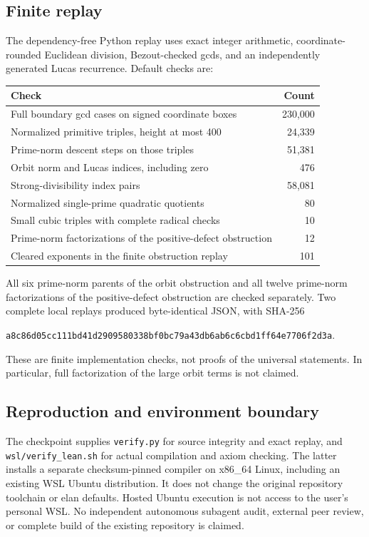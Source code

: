 \subsection{Finite replay}
The dependency-free Python replay uses exact integer arithmetic, coordinate-rounded Euclidean division, Bezout-checked gcds, and an independently generated Lucas recurrence. Default checks are:
\begin{center}
\begin{tabular}{@{}lr@{}}
\toprule
Check & Count\\\midrule
Full boundary gcd cases on signed coordinate boxes & 230,000\\
Normalized primitive triples, height at most 400 & 24,339\\
Prime-norm descent steps on those triples & 51,381\\
Orbit norm and Lucas indices, including zero & 476\\
Strong-divisibility index pairs & 58,081\\
Normalized single-prime quadratic quotients & 80\\
Small cubic triples with complete radical checks & 10\\
Prime-norm factorizations of the positive-defect obstruction & 12\\
Cleared exponents in the finite obstruction replay & 101\\\bottomrule
\end{tabular}
\end{center}
All six prime-norm parents of the orbit obstruction and all twelve prime-norm factorizations of the positive-defect obstruction are checked separately. Two complete local replays produced byte-identical JSON, with SHA-256
\begin{center}\small\texttt{a8c86d05cc111bd41d2909580338bf0bc79a43db6ab6c6cbd1ff64e7706f2d3a}.\end{center}
These are finite implementation checks, not proofs of the universal statements. In particular, full factorization of the large orbit terms is not claimed.

\subsection{Reproduction and environment boundary}
The checkpoint supplies \texttt{verify.py} for source integrity and exact replay, and \texttt{wsl/verify\_lean.sh} for actual compilation and axiom checking. The latter installs a separate checksum-pinned compiler on x86\_64 Linux, including an existing WSL Ubuntu distribution. It does not change the original repository toolchain or elan defaults. Hosted Ubuntu execution is not access to the user's personal WSL. No independent autonomous subagent audit, external peer review, or complete build of the existing repository is claimed.

